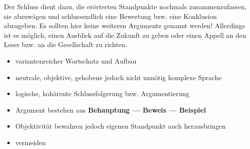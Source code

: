 \begin{enumerate}
\begin{itemize}
	\end{itemize}


	Der Schluss dient dazu, die er\"{o}rterten Standpunkte nochmals zusammenzufassen, sie abzuw\"{a}gen und schlussendlich eine Bewertung bzw. eine Konklusion abzugeben. Es sollten hier keine weiteren Argumente genannt werden! Allerdings ist es m\"{o}glich, einen Ausblick auf die Zukunft zu geben oder einen Appell an den Leser bzw. an die Gesellschaft zu richten.

\end{enumerate}


\begin{itemize}
	\item variantenreicher Wortschatz und Aufbau

	\item neutrale, objektive, gehobene jedoch nicht unn\"{o}tig komplexe Sprache

	\item logische, koh\"{a}rente Schlussfolgerung bzw. Argumentierung

	\item Argument bestehen aus \textbf{Behauptung --- Beweis --- Beispiel}

	\item Objektivit\"{a}t bewahren jedoch eigenen Standpunkt auch herausbringen

	\item {} vermeiden
\end{itemize}

